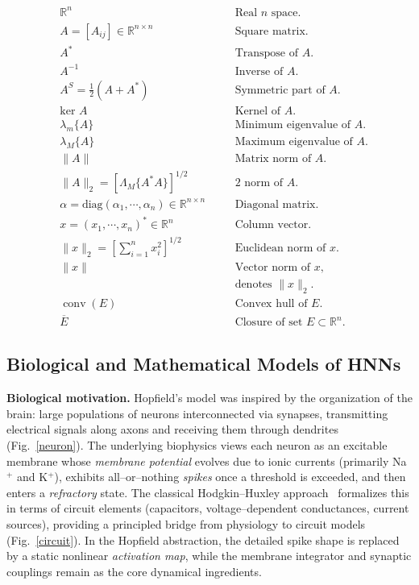 \documentclass[journal]{IEEEtran}
\theoremstyle{myplain}
\begin{document}
\begin{align*}
&\mathbb{R}^n &\quad&\text{Real } n \text{ space.}\\
&A = [A_{ij}] \in \mathbb{R}^{n \times n} &\quad&\text{Square matrix.}\\
&A^{*} &\quad&\text{Transpose of } A.\\
&A^{-1} &\quad&\text{Inverse of } A.\\
&A^S = \tfrac{1}{2}(A + A^{*}) &\quad&\text{Symmetric part of } A.\\
&\text{ker } A &\quad&\text{Kernel of } A.\\
&\lambda_m\{A\} &\quad&\text{Minimum eigenvalue of } A.\\
&\lambda_M\{A\} &\quad&\text{Maximum eigenvalue of } A.\\
&\|A\| &\quad&\text{Matrix norm of } A.\\
&\|A\|_2 = [\Lambda_M\{A^{*}A\}]^{1/2} &\quad&2 \text{ norm of } A.\\
&\alpha = \text{diag}(\alpha_1, \cdots, \alpha_n) \in \mathbb{R}^{n \times n} &\quad&\text{Diagonal matrix.}\\ 
&x = (x_1, \cdots, x_n)^{*} \in \mathbb{R}^n &\quad&\text{Column vector.}\\
&\|x\|_2 = \left[\sum_{i=1}^n x_i^2\right]^{1/2} &\quad&\text{Euclidean norm of } x.\\
&\|x\| &\quad&\text{Vector norm of } x \text{,}\\
& & &\text{denotes }\|x\|_2.\\ 
&\operatorname{conv}(E) &\quad&\text{Convex hull of } E.\\
&\overline{E} &\quad&\text{Closure of set } E \subset \mathbb{R}^n.
\end{align*}



\subsection{Biological and Mathematical Models of HNNs}\label{sec:biomath}

\textbf{Biological motivation.}
Hopfield’s model was inspired by the organization of the brain: 
large populations of neurons interconnected via synapses, 
transmitting electrical signals along axons and receiving them through dendrites (Fig.~\ref{neuron}). 
The underlying biophysics views each neuron as an excitable membrane whose \emph{membrane potential} 
evolves due to ionic currents (primarily Na$^+$ and K$^+$), 
exhibits all–or–nothing \emph{spikes} once a threshold is exceeded, 
and then enters a \emph{refractory} state. 
The classical Hodgkin–Huxley approach~\cite{p224} formalizes this in terms of circuit elements 
(capacitors, voltage–dependent conductances, current sources), 
providing a principled bridge from physiology to circuit models (Fig.~\ref{circuit}). 
In the Hopfield abstraction, the detailed spike shape is replaced 
by a static nonlinear \emph{activation map}, 
while the membrane integrator and synaptic couplings remain 
as the core dynamical ingredients.
\end{document}
